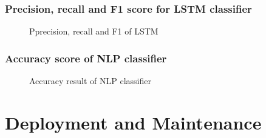 \documentclass[oneside,a4paper,12pt]{book}
\begin{document}
\subsection{Precision, recall and F1 score for LSTM classifier}
\begin{center}
	\begin{figure}[!htbp]
		\caption{Pprecision, recall and F1 of LSTM}
		\label{fig:precision, recall and F1 of LSTM}
	\end{figure}
\end{center} 

\subsection{Accuracy score of NLP classifier}
\begin{center}
	\begin{figure}[!htbp]
		\caption{Accuracy result of NLP classifier}
		\label{fig:accuracy of NLP}
	\end{figure}
\end{center} 

\chapter{Deployment and Maintenance}
\end{document}
